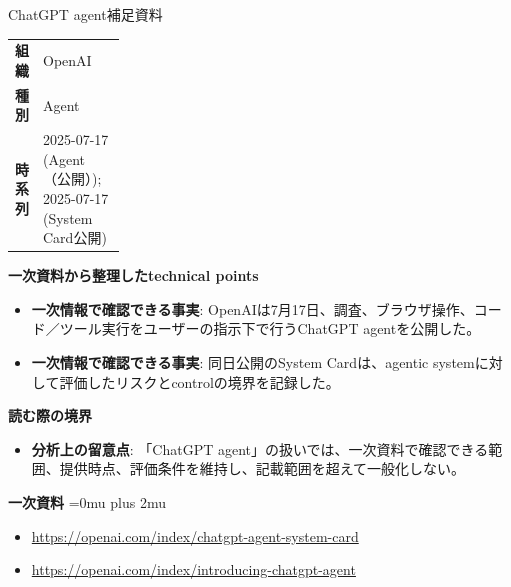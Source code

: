 \begin{technicalnote}{ChatGPT agent}{補足資料}
\begingroup
\begin{tabularx}{\linewidth}{@{}>{\bfseries}p{0.22\linewidth}X@{}}
組織 & OpenAI \\
種別 & Agent \\
時系列 & 2025-07-17 (Agent（公開）); 2025-07-17 (System Card公開) \\
\end{tabularx}
\smallskip
{\bfseries 一次資料から整理したtechnical points}
\begin{itemize}[leftmargin=1.5em,itemsep=0.35em]
\item \textbf{一次情報で確認できる事実}: OpenAIは7月17日、調査、ブラウザ操作、コード／ツール実行をユーザーの指示下で行うChatGPT agentを公開した。
\item \textbf{一次情報で確認できる事実}: 同日公開のSystem Cardは、agentic systemに対して評価したリスクとcontrolの境界を記録した。
\end{itemize}
\begin{minipage}{\linewidth}
{\bfseries 読む際の境界}
\begin{itemize}[leftmargin=1.5em,itemsep=0.35em]
\item \textbf{分析上の留意点}: 「ChatGPT agent」の扱いでは、一次資料で確認できる範囲、提供時点、評価条件を維持し、記載範囲を超えて一般化しない。
\end{itemize}
\begin{samepage}
{\bfseries 一次資料}
\begingroup\sloppy
\Urlmuskip=0mu plus 2mu\relax
\begin{itemize}[leftmargin=1.5em,itemsep=0.25em]
\item {\scriptsize\url{https://openai.com/index/chatgpt-agent-system-card}}
\item {\scriptsize\url{https://openai.com/index/introducing-chatgpt-agent}}
\end{itemize}
\endgroup
\end{samepage}
\end{minipage}
\endgroup
\end{technicalnote}
\medskip


